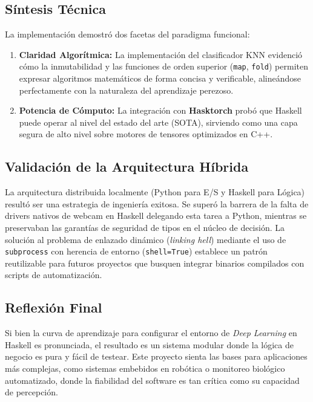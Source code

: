 \documentclass[12pt, letterpaper]{article}
\begin{document}
\subsection{Síntesis Técnica}
La implementación demostró dos facetas del paradigma funcional:
\begin{enumerate}
    \item \textbf{Claridad Algorítmica:} La implementación del clasificador KNN evidenció cómo la inmutabilidad y las funciones de orden superior (\texttt{map}, \texttt{fold}) permiten expresar algoritmos matemáticos de forma concisa y verificable, alineándose perfectamente con la naturaleza del aprendizaje perezoso.
    \item \textbf{Potencia de Cómputo:} La integración con \textbf{Hasktorch} probó que Haskell puede operar al nivel del estado del arte (SOTA), sirviendo como una capa segura de alto nivel sobre motores de tensores optimizados en C++.
\end{enumerate}

\subsection{Validación de la Arquitectura Híbrida}
La arquitectura distribuida localmente (Python para E/S y Haskell para Lógica) resultó ser una estrategia de ingeniería exitosa. Se superó la barrera de la falta de drivers nativos de webcam en Haskell delegando esta tarea a Python, mientras se preservaban las garantías de seguridad de tipos en el núcleo de decisión.
La solución al problema de enlazado dinámico (\textit{linking hell}) mediante el uso de \texttt{subprocess} con herencia de entorno (\texttt{shell=True}) establece un patrón reutilizable para futuros proyectos que busquen integrar binarios compilados con scripts de automatización.

\subsection{Reflexión Final}
Si bien la curva de aprendizaje para configurar el entorno de \textit{Deep Learning} en Haskell es pronunciada, el resultado es un sistema modular donde la lógica de negocio es pura y fácil de testear. Este proyecto sienta las bases para aplicaciones más complejas, como sistemas embebidos en robótica o monitoreo biológico automatizado, donde la fiabilidad del software es tan crítica como su capacidad de percepción.
\end{document}

